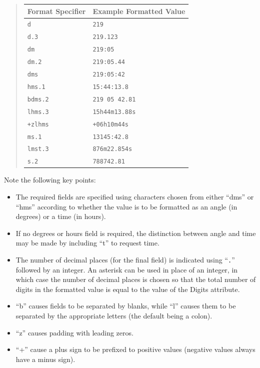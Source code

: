 \documentclass[twoside,11pt]{starlink}
\begin{document}
\begin{quote}
\begin{center}
\begin{tabular}{|l|l|}
\hline
\textbf{Format Specifier} & \textbf{Example Formatted Value}\\
\hline \hline
{\tt{d}} & {\tt{219}}\\
{\tt{d.3}} & {\tt{219.123}}\\
{\tt{dm}} & {\tt{219:05}}\\
{\tt{dm.2}} & {\tt{219:05.44}}\\
{\tt{dms}} & {\tt{219:05:42}}\\
{\tt{hms.1}} & {\tt{15:44:13.8}}\\
{\tt{bdms.2}} & {\tt{219 05 42.81}}\\
{\tt{lhms.3}} & {\tt{15h44m13.88s}}\\
{\tt{+zlhms}} & {\tt{+06h10m44s}}\\
{\tt{ms.1}} & {\tt{13145:42.8}}\\
{\tt{lmst.3}} & {\tt{876m22.854s}}\\
{\tt{s.2}} & {\tt{788742.81}}\\
\hline
\end{tabular}
\end{center}
\end{quote}

Note the following key points:

\begin{itemize}
\item The required fields are specified using characters chosen from
either ``dms'' or ``hms'' according to whether the value is to be
formatted as an angle (in degrees) or a time (in hours).

\item If no degrees or hours field is required, the distinction
between angle and time may be made by including ``t'' to request time.

\item The number of decimal places (for the final field) is indicated
using ``\texttt{.}'' followed by an integer. An asterisk can be used in
place of an integer, in which case the number of decimal places is
chosen so that the total number of digits in the formatted value is equal
to the value of the Digits attribute.

\item ``b'' causes fields to be separated by blanks, while ``l''
causes them to be separated by the appropriate letters (the default
being a colon).

\item ``z'' causes padding with leading zeros.

\item ``+'' cause a plus sign to be prefixed to positive values
(negative values always have a minus sign).
\end{itemize}
\end{document}
